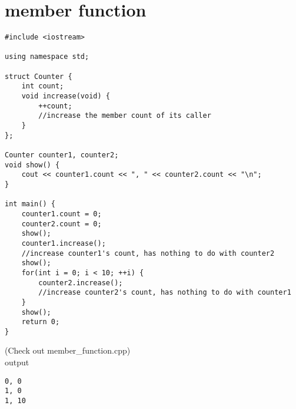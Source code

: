 \documentclass{article}
\begin{document}
\section{member function}
\begin{lstlisting}
#include <iostream>

using namespace std;

struct Counter {
    int count;
    void increase(void) {
        ++count;
        //increase the member count of its caller
    }
};

Counter counter1, counter2;
void show() {
    cout << counter1.count << ", " << counter2.count << "\n";
}

int main() {
    counter1.count = 0;
    counter2.count = 0;
    show();
    counter1.increase();
    //increase counter1's count, has nothing to do with counter2
    show();
    for(int i = 0; i < 10; ++i) {
        counter2.increase();
        //increase counter2's count, has nothing to do with counter1
    }
    show();
    return 0;
}
\end{lstlisting}
(Check out member\_function.cpp)\\
output
\begin{lstlisting}
0, 0
1, 0
1, 10
\end{lstlisting}
\end{document}

